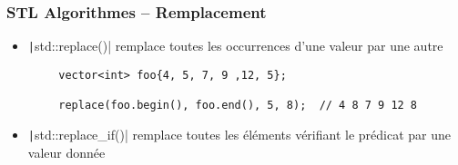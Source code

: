 \documentclass[C++.tex]{subfiles}
\begin{document}
\begin{frame}[fragile]
	\frametitle{STL Algorithmes -- Remplacement}
	\begin{itemize}
		\item \texttt|std::replace()| remplace toutes les occurrences d'une valeur par une autre
	\end{itemize}

	\begin{verbatim}
		vector<int> foo{4, 5, 7, 9 ,12, 5};

		replace(foo.begin(), foo.end(), 5, 8);  // 4 8 7 9 12 8
	\end{verbatim}

	\begin{itemize}
		\item \texttt|std::replace_if()| remplace toutes les éléments vérifiant le prédicat par une valeur donnée
	\end{itemize}
\end{frame}
\end{document}
